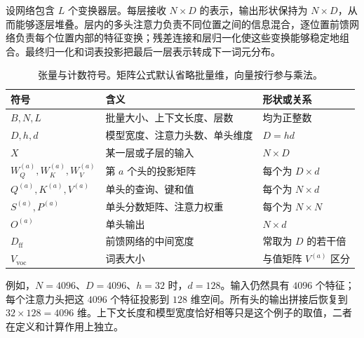 设网络包含 $L$ 个变换器层。每层接收 $N\times D$ 的表示，输出形状保持为 $N\times D$，从而能够逐层堆叠。层内的多头注意力负责不同位置之间的信息混合，逐位置前馈网络负责每个位置内部的特征变换；残差连接和层归一化使这些变换能够稳定地组合。最终归一化和词表投影把最后一层表示转成下一词元分布。

\begin{table}[H]
\centering
\caption{张量与计数符号。矩阵公式默认省略批量维，向量按行参与乘法。}
\label{l12:tab:notation}
\small
\begin{tabularx}{\linewidth}{@{}L{3.4cm}Y L{3.5cm}@{}}
\toprule
符号 & 含义 & 形状或关系\\
\midrule
$B,N,L$ & 批量大小、上下文长度、层数 & 均为正整数\\
$D,h,d$ & 模型宽度、注意力头数、单头维度 & $D=hd$\\
$X$ & 某一层或子层的输入 & $N\times D$\\
$W_Q^{(a)},W_K^{(a)},W_V^{(a)}$ & 第 $a$ 个头的投影矩阵 & 每个为 $D\times d$\\
$Q^{(a)},K^{(a)},V^{(a)}$ & 单头的查询、键和值 & 每个为 $N\times d$\\
$S^{(a)},P^{(a)}$ & 单头分数矩阵、注意力权重 & 每个为 $N\times N$\\
$O^{(a)}$ & 单头输出 & $N\times d$\\
$D_{\mathrm{ff}}$ & 前馈网络的中间宽度 & 常取为 $D$ 的若干倍\\
$V_{\mathrm{voc}}$ & 词表大小 & 与值矩阵 $V^{(a)}$ 区分\\
\bottomrule
\end{tabularx}
\end{table}

例如，$N=4096$、$D=4096$、$h=32$ 时，$d=128$。输入仍然具有 $4096$ 个特征；每个注意力头把这 $4096$ 个特征投影到 $128$ 维空间。所有头的输出拼接后恢复到 $32\times128=4096$ 维。上下文长度和模型宽度恰好相等只是这个例子的取值，二者在定义和计算作用上独立。
